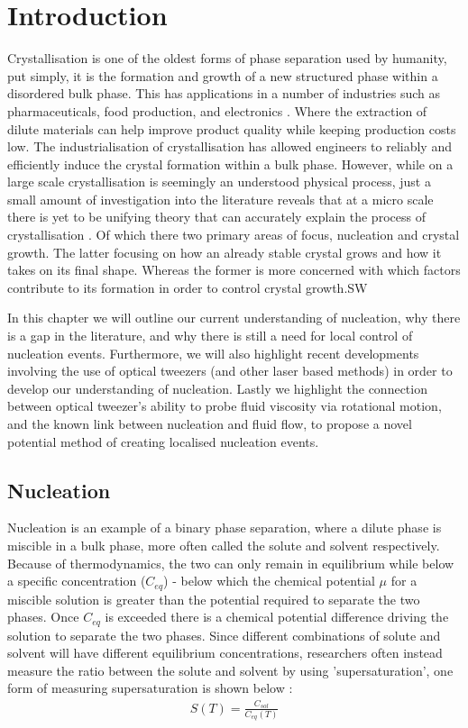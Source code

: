 \chapter{Introduction}
Crystallisation is one of the oldest forms of phase separation used by humanity\cite{Schoen1956}, put simply, it is the formation and growth 
of a new structured phase within a disordered bulk phase. This has 
applications in a number of industries such as pharmaceuticals, food 
production, and electronics \cite{Myerson2002}. Where the extraction 
of dilute materials can help improve product quality while keeping 
production costs low. The industrialisation of crystallisation has 
allowed engineers to reliably and efficiently induce the crystal 
formation within a bulk phase. However, while on a large scale 
crystallisation is seemingly an understood physical process, just a 
small amount of investigation into the literature reveals that at a 
micro scale there is yet to be unifying theory that can accurately 
explain the process of crystallisation \cite{Fu2021}. Of which there 
two primary areas of focus, nucleation and crystal growth. The latter 
focusing on how an already stable crystal grows and how it takes on its 
final shape. Whereas the former is more concerned with which factors 
contribute to its formation in order to control crystal growth.SW

In this chapter we will outline our current understanding of nucleation,
why there is a gap in the literature, and why there is still a need for
local control of nucleation events. Furthermore, we will also highlight
recent developments involving the use of optical tweezers (and other 
laser based methods) in order to develop our understanding of nucleation.
Lastly we highlight the connection between optical tweezer's ability to 
probe fluid viscosity via rotational motion, and the known link between
nucleation and fluid flow, to propose a novel potential method of 
creating localised nucleation events.
 
\section{Nucleation}
Nucleation is an example of a binary phase separation, where a dilute phase 
is miscible in a bulk phase, more often called the solute and solvent 
respectively. Because of thermodynamics, the two can only remain in 
equilibrium while below a specific concentration ($C_{eq}$) - below which 
the chemical potential $\mu$ for a miscible solution is greater than the 
potential required to separate the two phases. Once $C_{eq}$ is exceeded 
there is a chemical potential difference driving the solution to separate 
the two phases. Since different combinations of solute and solvent will 
have different equilibrium concentrations, researchers often instead measure 
the ratio between the solute and solvent by using 'supersaturation', one 
form of measuring supersaturation is shown below \cite{Mullin2001}:
\begin{align}
	\label{eq:supersaturation}
	S(T) = \frac{C_{sol}}{C_{eq}(T)}
\end{align}

